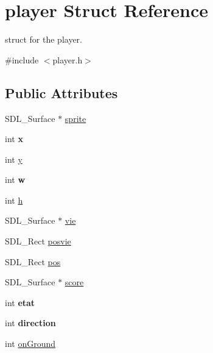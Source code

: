 \hypertarget{structplayer}{}\section{player Struct Reference}
\label{structplayer}


struct for the player.  




{\ttfamily \#include $<$player.\+h$>$}

\subsection*{Public Attributes}
\begin{DoxyCompactItemize}
\item 
S\+D\+L\+\_\+\+Surface $\ast$ \hyperlink{structplayer_a8eb447d983b58372fbda6acabc8debf7}{sprite}
\item 
\mbox{\label{structplayer_a2ee7d18d25bfcab15206b51e270e83e4}} 
int {\bfseries x}
\item 
int \hyperlink{structplayer_ab1da25240a30a5563d4e0714dade1575}{y}
\item 
\mbox{\label{structplayer_ab8dc4dc3bbd0d790b11165df9bb40e52}} 
int {\bfseries w}
\item 
int \hyperlink{structplayer_a1441d078ab0d7c6d10ef599dedf6a152}{h}
\item 
S\+D\+L\+\_\+\+Surface $\ast$ \hyperlink{structplayer_acb0feb6ffa46f0e9f353855fc9d7eb42}{vie}
\item 
S\+D\+L\+\_\+\+Rect \hyperlink{structplayer_ada95eb1aa625314bda28a04331d55fec}{posvie}
\item 
S\+D\+L\+\_\+\+Rect \hyperlink{structplayer_a3ad723e25fd68342601e128927372c8f}{pos}
\item 
S\+D\+L\+\_\+\+Surface $\ast$ \hyperlink{structplayer_a2c9a8f2fce2b0a622f7d8ae2f9985633}{score}
\item 
\mbox{\label{structplayer_a60e124e0e95b5753fc3bd0f57a82f111}} 
int {\bfseries etat}
\item 
\mbox{\label{structplayer_a76bb880ef139fccfa7029af54b7d518f}} 
int {\bfseries direction}
\item 
int \hyperlink{structplayer_acddab25e7c26507904ed5105160af8f7}{on\+Ground}
\item 

\end{DoxyCompactItemize}
